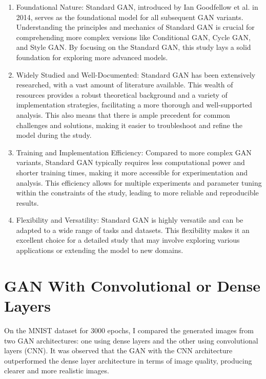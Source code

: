 \begin{enumerate}
    \item Foundational Nature: Standard GAN, introduced by Ian Goodfellow et al. in 2014, serves as the 
    foundational model for all subsequent GAN variants. Understanding the principles and mechanics of 
    Standard GAN is crucial for comprehending more complex versions like Conditional GAN, Cycle GAN, 
    and Style GAN. By focusing on the Standard GAN, this study lays a solid foundation for exploring more advanced models.

    \item Widely Studied and Well-Documented: Standard GAN has been extensively researched, with a 
    vast amount of literature available. This wealth of resources provides a robust theoretical 
    background and a variety of implementation strategies, facilitating a more thorough and 
    well-supported analysis. This also means that there is ample precedent for common challenges 
    and solutions, making it easier to troubleshoot and refine the model during the study.

    \item Training and Implementation Efficiency: Compared to more complex GAN variants, 
    Standard GAN typically requires less computational power and shorter training times, 
    making it more accessible for experimentation and analysis. This efficiency allows 
    for multiple experiments and parameter tuning within the constraints of the study, 
    leading to more reliable and reproducible results.

    \item Flexibility and Versatility: Standard GAN is highly versatile and can be adapted 
    to a wide range of tasks and datasets. This flexibility makes it an excellent choice for 
    a detailed study that may involve exploring various applications or extending the model to new domains.
\end{enumerate}


\section{GAN With Convolutional or Dense Layers}

On the MNIST dataset for 3000 epochs, I compared the generated images from two GAN architectures: one using dense layers and the other using convolutional layers (CNN). It was observed that the GAN with the CNN architecture outperformed the dense layer architecture in terms of image quality, producing clearer and more realistic images.

